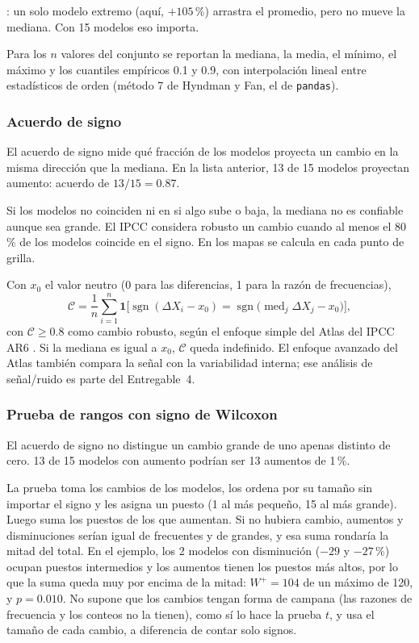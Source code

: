 \documentclass[11pt,a4paper]{article}
\begin{document}
: un solo modelo extremo (aquí, $+105$\,\%) arrastra el promedio, pero no mueve la mediana.
Con 15 modelos eso importa.

Para los $n$ valores del conjunto se reportan la mediana, la media, el mínimo, el máximo y los cuantiles empíricos 0.1 y 0.9, con interpolación lineal entre estadísticos de orden (método 7 de Hyndman y Fan, el de \texttt{pandas}).

\subsubsection{Acuerdo de signo}

El acuerdo de signo mide qué fracción de los modelos proyecta un cambio en la misma dirección que la mediana.
En la lista anterior, 13 de 15 modelos proyectan aumento: acuerdo de $13/15 = 0.87$.

Si los modelos no coinciden ni en si algo sube o baja, la mediana no es confiable aunque sea grande.
El IPCC considera robusto un cambio cuando al menos el 80\,\% de los modelos coincide en el signo.
En los mapas se calcula en cada punto de grilla.

Con $x_0$ el valor neutro (0 para las diferencias, 1 para la razón de frecuencias),
\begin{equation}
\label{eq:acuerdo}
\mathcal{C} = \frac{1}{n}\sum_{i=1}^{n} \mathbf{1}\Big[\operatorname{sgn}(\Delta X_i - x_0) = \operatorname{sgn}\big(\operatorname{med}_j \Delta X_j - x_0\big)\Big],
\end{equation}
con $\mathcal{C} \ge 0.8$ como cambio robusto, según el enfoque simple del Atlas del IPCC AR6 \citep{gutierrez2021}.
Si la mediana es igual a $x_0$, $\mathcal{C}$ queda indefinido.
El enfoque avanzado del Atlas también compara la señal con la variabilidad interna; ese análisis de señal/ruido es parte del Entregable~4.

\subsubsection{Prueba de rangos con signo de Wilcoxon}

El acuerdo de signo no distingue un cambio grande de uno apenas distinto de cero.
13 de 15 modelos con aumento podrían ser 13 aumentos de 1\,\%.

La prueba toma los cambios de los modelos, los ordena por su tamaño sin importar el signo y les asigna un puesto (1 al más pequeño, 15 al más grande).
Luego suma los puestos de los que aumentan.
Si no hubiera cambio, aumentos y disminuciones serían igual de frecuentes y de grandes, y esa suma rondaría la mitad del total.
En el ejemplo, los 2 modelos con disminución ($-29$ y $-27$\,\%) ocupan puestos intermedios y los aumentos tienen los puestos más altos, por lo que la suma queda muy por encima de la mitad: $W^{+} = 104$ de un máximo de 120, y $p = 0.010$.
No supone que los cambios tengan forma de campana (las razones de frecuencia y los conteos no la tienen), como sí lo hace la prueba $t$, y usa el tamaño de cada cambio, a diferencia de contar solo signos.
\end{document}
